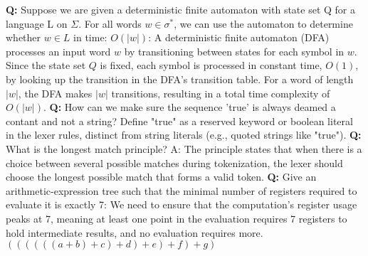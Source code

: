 \textbf{Q:} Suppose we are given a deterministic finite automaton with state set Q for a language L on $\Sigma$. For all words $w \in \sigma^*$, we can use the automaton to determine whether $w \in L$ in time: $O( \vert w \vert )$: A deterministic finite automaton (DFA) processes an input word $ w $ by transitioning between states for each symbol in $ w $. Since the state set $ Q $ is fixed, each symbol is processed in constant time, $ O(1) $, by looking up the transition in the DFA's transition table. For a word of length $  \vert w \vert  $, the DFA makes $  \vert w \vert  $ transitions, resulting in a total time complexity of $ O( \vert w \vert ) $.
\textbf{Q:} How can we make sure the sequence 'true' is always deamed a contant and not a string? Define "true" as a reserved keyword or boolean literal in the lexer rules, distinct from string literals (e.g., quoted strings like "true").
\textbf{Q:} What is the longest match principle?
A: The principle states that when there is a choice between several possible matches during tokenization, the lexer should choose the longest possible match that forms a valid token.
\textbf{Q:} Give an arithmetic-expression tree such that the minimal number of registers required to evaluate it is exactly 7: We need to ensure that the computation's register usage peaks at 7, meaning at least one point in the evaluation requires 7 registers to hold intermediate results, and no evaluation requires more. $((((((a + b) + c) + d) + e) + f) + g)$